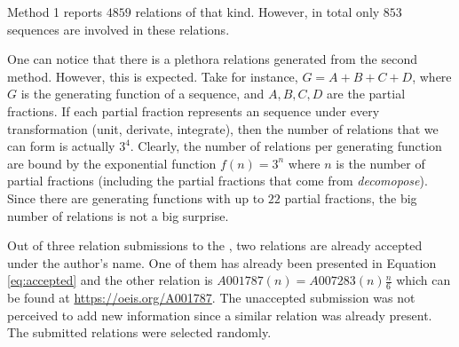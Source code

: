 Method 1 reports $4859$ relations of that kind. However, in total only $853$ sequences are involved in these relations.

One can notice that there is a plethora relations generated from the second method. However, this is expected.
Take for instance, $G = A + B + C + D$, where $G$ is the generating function of a sequence, and $A,B,C, D$ are the
partial fractions. If each partial fraction represents an \oeis sequence under every transformation (unit, derivate,
integrate), then the number of relations that we can form is actually $3^4$. Clearly,
the number of relations per generating function are bound by the exponential function $f(n) = 3^n$ where $n$ is the 
number of partial fractions (including the partial fractions that come from \emph{decomopose}). Since there are generating functions
with up to $22$ partial fractions, the big number of relations is not a big surprise.

Out of three relation submissions to the \oeis, two relations are already accepted
\cite{oeis-accepted-1,oeis-accepted-2} under the author's name. One of them has already
been presented in Equation \ref{eq:accepted} and the other relation is
$A001787(n) = A007283(n) \frac{n}{6}$ which can be found at
\url{https://oeis.org/A001787}. The unaccepted submission was not perceived to add new
information since a similar relation was already present. The submitted relations were
selected randomly.

